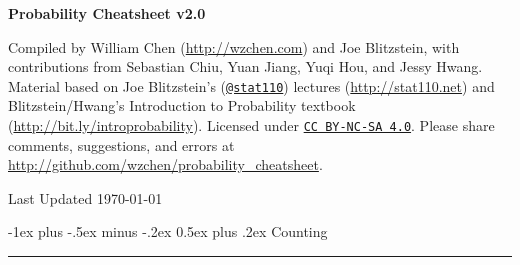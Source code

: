 \documentclass[10pt,landscape]{article}
\makeatletter
\renewcommand{\section}{\@startsection{section}{1}{0mm}%
                                {-1ex plus -.5ex minus -.2ex}%
                                {0.5ex plus .2ex}%
                                {\normalfont\large\bfseries}}
\makeatother
\begin{document}
\raggedright
\footnotesize
\begin{multicols*}{3}
            
    \setlength{\premulticols}{1pt}
    \setlength{\postmulticols}{1pt}
    \setlength{\multicolsep}{1pt}
    \setlength{\columnsep}{2pt}
            
            
    \begin{center}
      {\color{blue} \Large{\textbf{Probability Cheatsheet v2.0}}} \\
        
    \end{center}
            
            
    \scriptsize
            
    Compiled by William Chen (\url{http://wzchen.com}) and Joe Blitzstein, with contributions from Sebastian Chiu, Yuan Jiang, Yuqi Hou, and Jessy Hwang. Material based on Joe Blitzstein's (\texttt{\href{http://twitter.com/stat110}{@stat110}}) lectures (\url{http://stat110.net}) and Blitzstein/Hwang's Introduction to Probability textbook (\url{http://bit.ly/introprobability}). Licensed under \texttt{\href{http://creativecommons.org/licenses/by-nc-sa/4.0/}{CC BY-NC-SA 4.0}}. Please share comments, suggestions, and errors at \url{http://github.com/wzchen/probability_cheatsheet}.
            
    \begin{center}
        Last Updated \today
    \end{center}
            
            
            
            
    \section{Counting}\smallskip \hrule height 2pt \smallskip
            

\end{multicols*}
\end{document}

